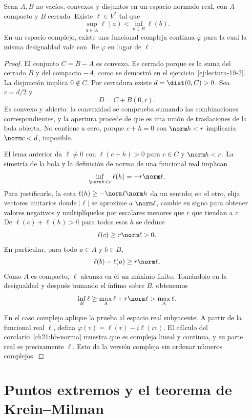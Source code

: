 \begin{teorema}\label{ch24:separacion}
Sean $A,B$ no vacíos, convexos y disjuntos en un espacio normado real, con $A$ compacto y $B$ cerrado. Existe $\ell\in V^*$ tal que
\[
 \sup_{a\in A}\ell(a)<\inf_{b\in B}\ell(b).
\]
En un espacio complejo, existe una funcional compleja continua $\varphi$ para la cual la misma desigualdad vale con $\operatorname{Re}\varphi$ en lugar de $\ell$.
\end{teorema}
\begin{proof}
El conjunto $C=B-A$ es convexo. Es cerrado porque es la suma del cerrado $B$ y del compacto $-A$, como se demostró en el ejercicio~\ref{ej:lectura-19-2}. La disjunción implica $0\notin C$. Por cerradura existe $d=\dist(0,C)>0$. Sea $r=d/2$ y
\[
 D=C+B(0,r).
\]
Es convexo y abierto: la convexidad se comprueba sumando las combinaciones correspondientes, y la apertura procede de que es una unión de traslaciones de la bola abierta. No contiene a cero, porque $c+h=0$ con $\norm h<r$ implicaría $\norm c<d$, imposible.

El lema anterior da $\ell\ne0$ con $\ell(c+h)>0$ para $c\in C$ y $\norm h<r$. La simetría de la bola y la definición de norma de una funcional real implican
\[
 \inf_{\norm h<r}\ell(h)=-r\norm\ell.
\]
Para justificarlo, la cota $\ell(h)\geq-\norm\ell\norm h$ da un sentido; en el otro, elija vectores unitarios donde $|\ell|$ se aproxime a $\norm\ell$, cambie su signo para obtener valores negativos y multiplíquelos por escalares menores que $r$ que tiendan a $r$. De $\ell(c)+\ell(h)>0$ para todos esos $h$ se deduce
\[
 \ell(c)\geq r\norm\ell>0.
\]
En particular, para todo $a\in A$ y $b\in B$,
\[
 \ell(b)-\ell(a)\geq r\norm\ell.
\]
Como $A$ es compacto, $\ell$ alcanza en él un máximo finito. Tomándolo en la desigualdad y después tomando el ínfimo sobre $B$, obtenemos
\[
 \inf_B\ell\geq\max_A\ell+r\norm\ell>\max_A\ell.
\]

En el caso complejo aplique la prueba al espacio real subyacente. A partir de la funcional real $\ell$, defina $\varphi(v)=\ell(v)-i\ell(iv)$. El cálculo del corolario~\ref{ch21:hb-norma} muestra que es compleja lineal y continua, y su parte real es precisamente $\ell$. Esto da la versión compleja sin ordenar números complejos.
\end{proof}

\section{Puntos extremos y el teorema de Krein--Milman}


